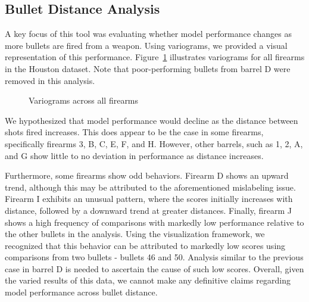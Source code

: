 \documentclass[
  12pt]{article}
\begin{document}
\subsection{Bullet Distance Analysis}\label{bullet-distance-analysis}

A key focus of this tool was evaluating whether model performance
changes as more bullets are fired from a weapon. Using variograms, we
provided a visual representation of this performance.
Figure~\ref{fig-variograms} illustrates variograms for all firearms in
the Houston dataset. Note that poor-performing bullets from barrel D
were removed in this analysis.

\begin{figure}


\caption{\label{fig-variograms}Variograms across all firearms}

\end{figure}%

We hypothesized that model performance would decline as the distance
between shots fired increases. This does appear to be the case in some
firearms, specifically firearms 3, B, C, E, F, and H. However, other
barrels, such as 1, 2, A, and G show little to no deviation in
performance as distance increases.

Furthermore, some firearms show odd behaviors. Firearm D shows an upward
trend, although this may be attributed to the aforementioned mislabeling
issue. Firearm I exhibits an unusual pattern, where the scores initially
increases with distance, followed by a downward trend at greater
distances. Finally, firearm J shows a high frequency of comparisons with
markedly low performance relative to the other bullets in the analysis.
Using the visualization framework, we recognized that this behavior can
be attributed to markedly low scores using comparisons from two bullets
- bullets 46 and 50. Analysis similar to the previous case in barrel D
is needed to ascertain the cause of such low scores. Overall, given the
varied results of this data, we cannot make any definitive claims
regarding model performance across bullet distance.
\end{document}
